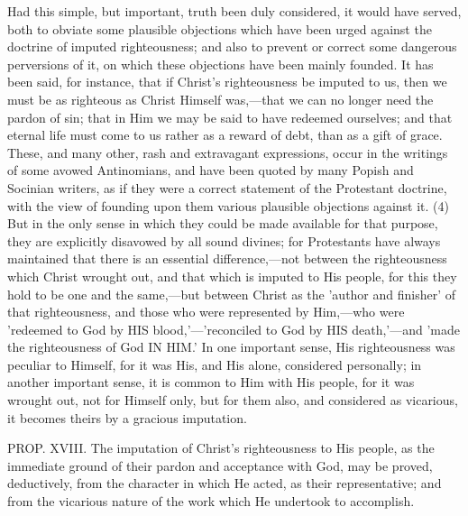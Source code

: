 \documentclass[
]{book}
\begin{document}
Had this simple, but important, truth been duly considered, it would have served, both to obviate some plausible objections which have been urged against the doctrine of imputed righteousness; and also to prevent or correct some dangerous perversions of it, on which these objections have been mainly founded. It has been said, for instance, that if Christ's righteousness be imputed to us, then we must be as righteous as Christ Himself was,---that we can no longer need the pardon of sin; that in Him we may be said to have redeemed ourselves; and that eternal life must come to us rather as a reward of debt, than as a gift of grace. These, and many other, rash and extravagant expressions, occur in the writings of some avowed Antinomians, and have been quoted by many Popish and Socinian writers, as if they were a correct statement of the Protestant doctrine, with the view of founding upon them various plausible objections against it. (4) But in the only sense in which they could be made available for that purpose, they are explicitly disavowed by all sound divines; for Protestants have always maintained that there is an essential difference,---not between the righteousness which Christ wrought out, and that which is imputed to His people, for this they hold to be one and the same,---but between Christ as the 'author and finisher' of that righteousness, and those who were represented by Him,---who were 'redeemed to God by HIS blood,'---'reconciled to God by HIS death,'---and 'made the righteousness of God IN HIM.' In one important sense, His righteousness was peculiar to Himself, for it was His, and His alone, considered personally; in another important sense, it is common to Him with His people, for it was wrought out, not for Himself only, but for them also, and considered as vicarious, it becomes theirs by a gracious imputation.

PROP. XVIII. The imputation of Christ's righteousness to His people, as the immediate ground of their pardon and acceptance with God, may be proved, deductively, from the character in which He acted, as their representative; and from the vicarious nature of the work which He undertook to accomplish.
\end{document}
